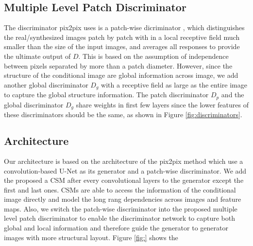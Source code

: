 \subsection{Multiple Level Patch Discriminator}
The discriminator pix2pix uses is a patch-wise dicriminator \cite{PatchGANs}, which distinguishes the real/synthesized images patch by patch with in a local receptive field much smaller than the size of the input images, and averages all responses to provide the ultimate output of $D$. This is based on the assumption of independence between pixels separated by more than a patch diameter. However, since the structure of the conditional image are global information across image, we add another global discriminator $D_g$ with a receptive field as large as the entire image to capture the global structure information. The patch discriminator $D_p$ and the global discriminator $D_g$ share weights in first few layers since the lower features of these discriminators should be the same, as shown in Figure \ref{fig:discriminators}.
%
%
\subsection{Architecture}
Our architecture is based on the architecture of the pix2pix method which use a convolution-based U-Net \cite{Unet} as its generator and a patch-wise discriminator. We add the proposed a CSM after every convolutional layers to the generator except the first and last ones. CSMs are able to access the information of the conditional image directly and model the long rang dependencies across images and feature maps. Also, we switch the patch-wise discriminator into the proposed multiple level patch discriminator to enable the discriminator network to capture both global and local information and therefore guide the generator to generator images with more structural layout.  
Figure \ref{fig:} shows the 
